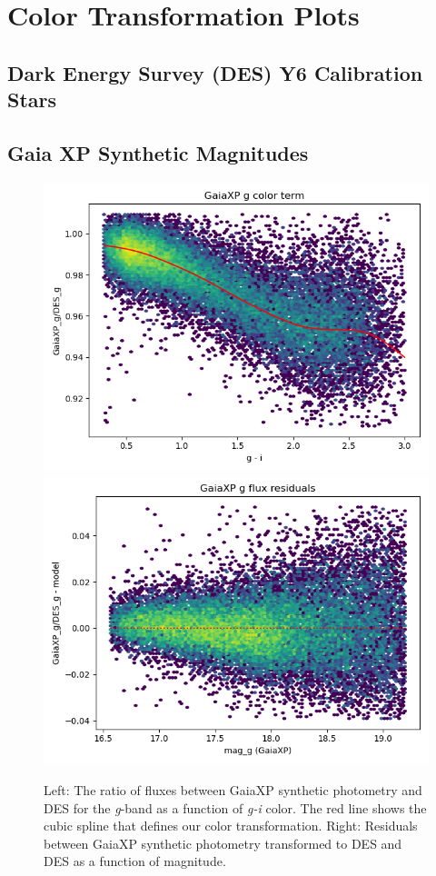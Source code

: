 \section{Color Transformation Plots}
\label{app:colorplots}
\subsection{Dark Energy Survey (DES) Y6 Calibration Stars}

\subsection{Gaia XP Synthetic Magnitudes}
\begin{figure}
    \includegraphics[width=0.49\linewidth]{./figures/color_terms/GaiaXP_to_DES_band_g_color_term.png}
    \includegraphics[width=0.49\linewidth]{./figures/color_terms/GaiaXP_to_DES_band_g_flux_residuals.png}
    \caption{Left: The ratio of fluxes between GaiaXP synthetic photometry and DES for the \textit{g}-band as a function of \textit{g-i} color. The red line shows the cubic spline that defines our color transformation.
    Right: Residuals between GaiaXP synthetic photometry transformed to DES and DES as a function of magnitude.}
    \label{fig:acolor-xp-g}
\end{figure}
